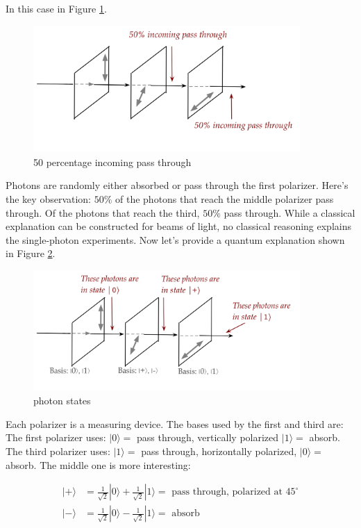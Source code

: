\documentclass[main.tex]{subfiles}
\begin{document}
    In this case in Figure \ref{fig:27polarizer4}.

    \begin{figure}
        \centering
        \includegraphics[width=4in]{notes/figs/n05/27polarizer4.png}
        \caption{50 percentage incoming pass through}
        \label{fig:27polarizer4}
    \end{figure} 
    
    Photons are randomly either absorbed or pass through the first polarizer. Here's the key observation: $50 \%$ of the photons that reach the middle polarizer pass through. Of the photons that reach the third, $50 \%$ pass through. While a classical explanation can be constructed for beams of light, no classical reasoning explains the single-photon experiments. Now let's provide a quantum explanation shown in Figure \ref{fig:28polarizer5}.
    
    \begin{figure}
        \centering
        \includegraphics[width=4in]{notes/figs/n05/28polarizer5.png}
        \caption{photon states}
        \label{fig:28polarizer5}
    \end{figure}
    
    Each polarizer is a measuring device. The bases used by the first and third are: The first polarizer uses: $|0\rangle=$ pass through, vertically polarized $|1\rangle=$ absorb. The third polarizer uses: $|1\rangle=$ pass through, horizontally polarized, $|0\rangle=$ absorb. The middle one is more interesting:
    
    $$
    \begin{aligned}
    |+\rangle &=\frac{1}{\sqrt{2}}|0\rangle+\frac{1}{\sqrt{2}}|1\rangle=\text { pass through, polarized at } 45^{\circ} \\
    |-\rangle &=\frac{1}{\sqrt{2}}|0\rangle-\frac{1}{\sqrt{2}}|1\rangle=\text { absorb }
    \end{aligned}
    $$
    
\end{document}

